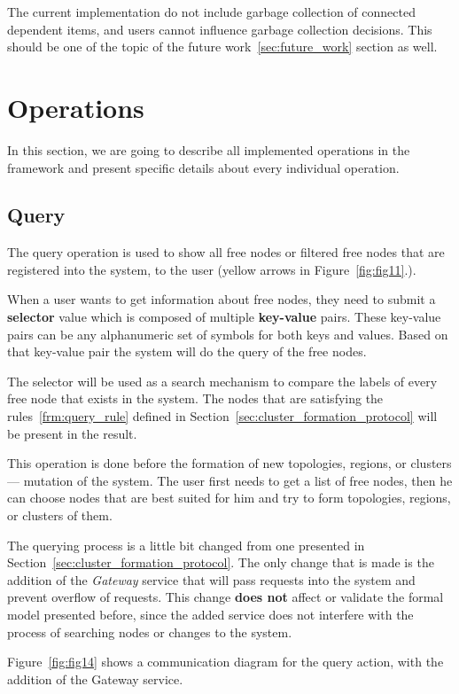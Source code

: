 The current implementation do not include garbage collection of connected dependent items, and users cannot influence garbage collection decisions. This should be one of the topic of the future work~\ref{sec:future_work} section as well.
%
%
\section{Operations}\label{sec:framework_operations}
%
In this section, we are going to describe all implemented operations in the framework and present specific details about every individual operation.
%
%
\subsection{Query}\label{sec:query} 
% 
The query operation is used to show all free nodes or filtered free nodes that are registered into the system, to the user (yellow arrows in Figure~\ref{fig:fig11}.). 

When a user wants to get information about free nodes, they need to submit a \textbf{selector} value which is composed of multiple \textbf{key-value} pairs.  These key-value pairs can be any alphanumeric set of symbols for both keys and values. Based on that key-value pair the system will do the query of the free nodes.

The selector will be used as a search mechanism to compare the labels of every free node that exists in the system. The nodes that are satisfying the rules~\ref{frm:query_rule} defined in Section~\ref{sec:cluster_formation_protocol} will be present in the result.

This operation is done before the formation of new topologies, regions, or clusters --- mutation of the system. The user first needs to get a list of free nodes, then he can choose nodes that are best suited for him and try to form topologies, regions, or clusters of them.

The querying process is a little bit changed from one presented in Section~\ref{sec:cluster_formation_protocol}. The only change that is made is the addition of the \emph{Gateway} service that will pass requests into the system and prevent overflow of requests. This change \textbf{does not} affect or validate the formal model presented before, since the added service does not interfere with the process of searching nodes or changes to the system.

Figure~\ref{fig:fig14} shows a communication diagram for the query action, with the addition of the Gateway service.

